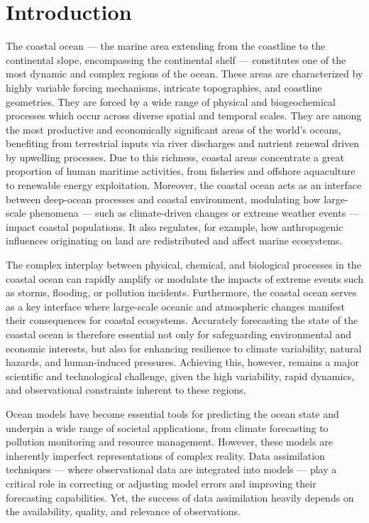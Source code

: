 \section{Introduction}


The coastal ocean — the marine area extending from the coastline to the
continental slope, encompassing the continental shelf — constitutes one
of the most dynamic and complex regions of the ocean. These areas are
characterized by highly variable forcing mechanisms, intricate
topographies, and coastline geometries. They are forced by a wide range
of physical and biogeochemical processes which occur across diverse
spatial and temporal scales. They are among the most productive and
economically significant areas of the world’s oceans, benefiting from
terrestrial inputs via river discharges and nutrient renewal driven by
upwelling processes. Due to this richness, coastal areas concentrate a
great proportion of human maritime activities, from fisheries and
offshore aquaculture to renewable energy exploitation. Moreover, the
coastal ocean acts as an interface between deep-ocean processes and
coastal environment, modulating how large-scale phenomena — such as
climate-driven changes or extreme weather events — impact coastal
populations. It also regulates, for example, how anthropogenic
influences originating on land are redistributed and affect marine
ecosystems.

The complex interplay between physical, chemical, and biological
processes in the coastal ocean can rapidly amplify or modulate the
impacts of extreme events such as storms, flooding, or pollution
incidents. Furthermore, the coastal ocean serves as a key interface
where large-scale oceanic and atmospheric changes manifest their
consequences for coastal ecosystems. Accurately forecasting the state of
the coastal ocean is therefore essential not only for safeguarding
environmental and economic interests, but also for enhancing resilience
to climate variability, natural hazards, and human-induced pressures.
Achieving this, however, remains a major scientific and technological
challenge, given the high variability, rapid dynamics, and observational
constraints inherent to these regions.

Ocean models have become essential tools for predicting the ocean state
and underpin a wide range of societal applications, from climate
forecasting to pollution monitoring and resource management. However,
these models are inherently imperfect representations of complex
reality. Data assimilation techniques — where observational data are
integrated into models — play a critical role in correcting or adjusting
model errors and improving their forecasting capabilities. Yet, the
success of data assimilation heavily depends on the availability,
quality, and relevance of observations.

